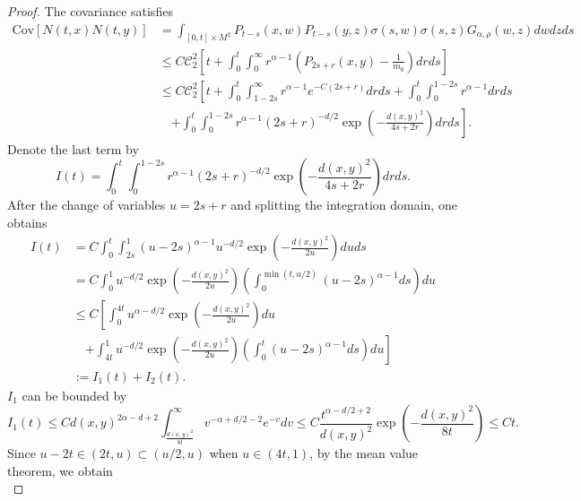 \documentclass[12pt]{amsart}
\numberwithin{equation}{section}
\newcommand{\1}{\mathbf{1}}
\begin{document}
\begin{proof}
    The covariance satisfies
    \begin{equation*}
    \begin{split}
        \text{Cov}[N(t,x)N(t,y)] &= \int_{[0,t]\times M^2}P_{t-s}(x,w)P_{t-s}(y,z)\sigma(s,w)\sigma(s,z)G_{\alpha,\rho}(w,z)dwdzds\\
        &\leq C\mathcal{C}_2^2\left[t+ \int_0^t\int_0^\infty r^{\alpha-1}\left(P_{2s+r}(x,y)-\frac{1}{m_0}\right)drds\right]\\
        &\leq C\mathcal{C}_2^2\left[t+\int_0^t\int_{1-2s}^\infty r^{\alpha-1}e^{-C(2s+r)}drds+\int_0^t\int_0^{1-2s}r^{\alpha-1}drds\right.\\
        &\quad\left.+\int_0^t\int_0^{1-2s}r^{\alpha-1}(2s+r)^{-d/2}\exp\left(-\frac{d(x,y)^2}{4s+2r}\right)drds\right].
    \end{split}
    \end{equation*}
    Denote the last term by
    \begin{equation*}
        I(t) = \int_0^t\int_0^{1-2s}r^{\alpha-1}(2s+r)^{-d/2}\exp\left(-\frac{d(x,y)^2}{4s+2r}\right)drds.
    \end{equation*}
After the change of variables $u=2s+r$ and splitting the integration domain, one obtains
    \begin{equation*}
        \begin{split}
             I(t)&=C\int_0^t\int_{2s}^{1}(u-2s)^{\alpha-1}u^{-d/2}\exp\left(-\frac{d(x,y)^2}{2u}\right)duds\\
             &=C\int_0^{1}u^{-d/2}\exp\left(-\frac{d(x,y)^2}{2u}\right)\left(\int_{0}^{\min(t,u/2)}(u-2s)^{\alpha-1}ds\right)du\\
             &\leq C\left[\int_0^{4t}u^{\alpha-d/2}\exp\left(-\frac{d(x,y)^2}{2u}\right)du\right.\\
             &\quad \left.+\int_{4t}^1u^{-d/2}\exp\left(-\frac{d(x,y)^2}{2u}\right)\left(\int_{0}^{t}(u-2s)^{\alpha-1}ds\right)du\right]\\
            &:=I_1(t)+I_2(t).
        \end{split}
    \end{equation*}
$I_1$ can be bounded by
\begin{equation*}
    I_1(t)\leq Cd(x,y)^{2\alpha-d+2}\int_{\frac{d(x,y)^2}{8t}}^\infty v^{-\alpha+d/2-2}e^{-v}dv\leq C\frac{t^{\alpha-d/2+2}}{d(x,y)^2}\exp\left(-\frac{d(x,y)^2}{8t}\right)\leq Ct.
\end{equation*}
 Since $u-2t\in(2t,u)\subset(u/2,u)$ when $u\in(4t,1)$, by the mean value theorem, we obtain
 \begin{equation*}

\end{equation*}
\end{proof}
\end{document}

